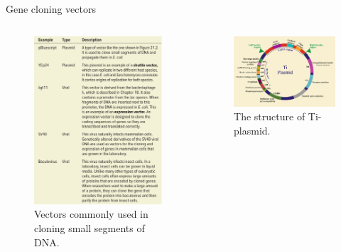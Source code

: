 \documentclass[
  ignorenonframetext,
  aspectratio=169]{beamer}
\newcommand{\bcolumns}{\begin{columns}[T, onlytextwidth]}
\newcommand{\ecolumns}{\end{columns}}
\begin{document}
\begin{frame}{Gene cloning vectors}
\protect\hypertarget{gene-cloning-vectors}{}
\bcolumns
{}

\begin{figure}
\includegraphics[width=0.76\linewidth]{../images/cloning_vectors} \caption{Vectors commonly used in cloning small segments of DNA.}\label{fig:cloning-vectors}
\end{figure}


\begin{figure}
\includegraphics[width=0.98\linewidth]{../images/Ti_plasmid} \caption{The structure of Ti-plasmid.}\label{fig:ti-plasmid}
\end{figure}

\ecolumns
\end{frame}
\end{document}
